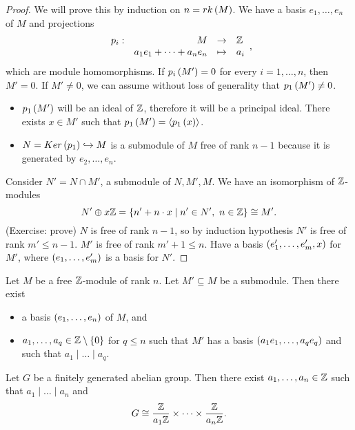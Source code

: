 \begin{proof}
We will prove this by induction on $ n = rk\left( M \right) $. We have a basis $ e_1, \dots, e_n $ of $ M $ and projections
$$ \function[p_i]{M}{\Z}{a_1e_1 + \dots + a_ne_n}{a_i}, $$
which are module homomorphisms. If $ p_i\left( M' \right) = 0 $ for every $ i = 1, \dots, n $, then $ M' = 0 $. If $ M' \ne 0 $, we can assume without loss of generality that $ p_1\left( M' \right) \ne 0 $.
\begin{itemize}
\item $ p_1\left( M' \right) $ will be an ideal of $ \mathbb{Z} $, therefore it will be a principal ideal. There exists $ x \in M' $ such that $ p_1\left( M' \right) = \left\langle p_1\left( x \right) \right\rangle $.
\item $ N = Ker\left( p_1 \right) \hookrightarrow M $ is a submodule of $ M $ free of rank $ n - 1 $ because it is generated by $ e_2, \dots, e_n $.
\end{itemize}
Consider $ N' = N \cap M' $, a submodule of $ N, M', M $. We have an isomorphism of $ \mathbb{Z} $-modules
$$ N' \oplus x\mathbb{Z} = \left\{ n' + n \cdot x \mid n' \in N', \ n \in \mathbb{Z} \right\} \cong M'. $$
(Exercise: prove) $ N $ is free of rank $ n - 1 $, so by induction hypothesis $ N' $ is free of rank $ m' \le n - 1 $. $ M' $ is free of rank $ m' + 1 \le n $. Have a basis $ \left( e_1', \dots, e_m', x \right) $ for $ M' $, where $ \left( e_1, \dots, e_m' \right) $ is a basis for $ N' $.
\end{proof}

\begin{theorem}
\label{thm:structure}
Let $ M $ be a free $ \mathbb{Z} $-module of rank $ n $. Let $ M' \subseteq M $ be a submodule. Then there exist
\begin{itemize}
\item a basis $ \left( e_1, \dots, e_n \right) $ of $ M $, and
\item $ a_1, \dots, a_q \in \mathbb{Z} \setminus \left\{ 0 \right\} $ for $ q \le n $ such that $ M' $ has a basis $ \left( a_1e_1, \dots, a_qe_q \right) $ and such that $ a_1 \mid \dots \mid a_q $.
\end{itemize}
\end{theorem}

\begin{corollary}
\label{cor:structure}
Let $ G $ be a finitely generated abelian group. Then there exist $ a_1, \dots, a_n \in \mathbb{Z} $ such that $ a_1 \mid \dots \mid a_n $ and
$$ G \cong \dfrac{\mathbb{Z}}{a_1\mathbb{Z}} \times \dots \times \dfrac{\mathbb{Z}}{a_n\mathbb{Z}}. $$
\end{corollary}


